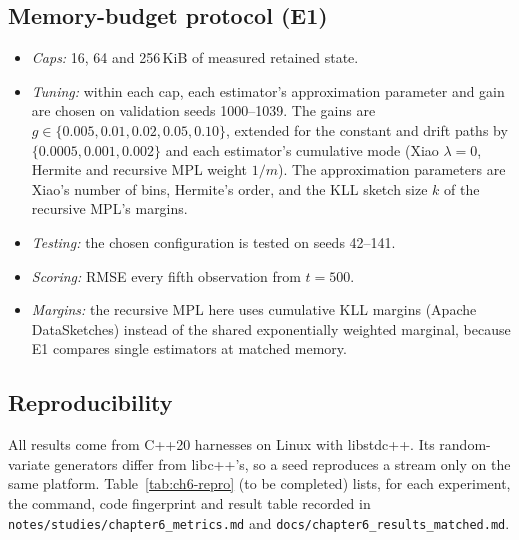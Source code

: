\subsection{Memory-budget protocol (E1)}
\begin{itemize}
  \item \emph{Caps:} 16, 64 and 256\,KiB of measured retained state.
  \item \emph{Tuning:} within each cap, each estimator's approximation parameter and gain are chosen on validation seeds 1000--1039. The gains are $g\in\{0.005, 0.01, 0.02, 0.05, 0.10\}$, extended for the constant and drift paths by $\{0.0005, 0.001, 0.002\}$ and each estimator's cumulative mode (Xiao $\lambda = 0$, Hermite and recursive MPL weight $1/m$). The approximation parameters are Xiao's number of bins, Hermite's order, and the KLL sketch size $k$ of the recursive MPL's margins.
  \item \emph{Testing:} the chosen configuration is tested on seeds 42--141.
  \item \emph{Scoring:} RMSE every fifth observation from $t = 500$.
  \item \emph{Margins:} the recursive MPL here uses cumulative KLL margins (Apache DataSketches) instead of the shared exponentially weighted marginal, because E1 compares single estimators at matched memory.
\end{itemize}

\subsection{Reproducibility}
All results come from C++20 harnesses on Linux with libstdc++.
Its random-variate generators differ from libc++'s, so a seed reproduces a stream only on the same platform.
Table~\ref{tab:ch6-repro} (to be completed) lists, for each experiment, the command, code fingerprint and result table recorded in \texttt{notes/studies/chapter6\_metrics.md} and \texttt{docs/chapter6\_results\_matched.md}.

